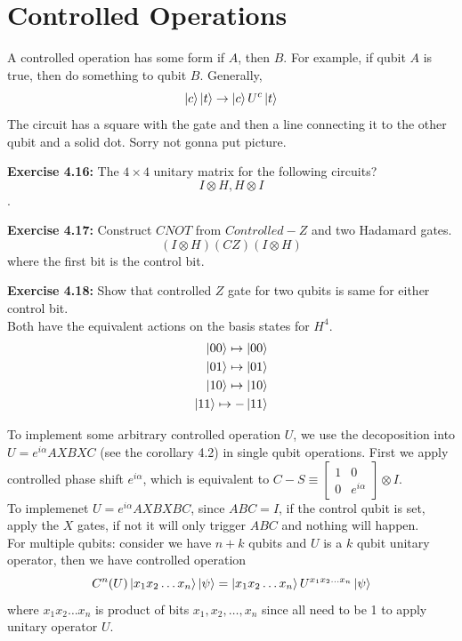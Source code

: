 \documentclass{article}
\begin{document}
\section{Controlled Operations}
A controlled operation has some form if $A$, then $B$. For example, if qubit $A$ is true, then do something to qubit $B$. Generally,
$$\ket{c}\ket{t} \to \ket{c} U^c \ket{t}$$ 
The circuit has a square with the gate and then a line connecting it to the other qubit and a solid dot. Sorry not gonna put picture.
\begin{tcolorbox}\textbf{Exercise 4.16:}
	The $4\times4$ unitary matrix for the following circuits?\\
	$$I\otimes H, H\otimes I$$.
\end{tcolorbox}
\begin{tcolorbox}\textbf{Exercise 4.17:}
	Construct $CNOT$ from $Controlled-Z$ and two Hadamard gates.\\
	$$(I \otimes H)(CZ)(I \otimes H)$$
	where the first bit is the control bit.
\end{tcolorbox}
\begin{tcolorbox}\textbf{Exercise 4.18:} Show that controlled $Z$ gate for two qubits is same for either control bit.\\
	Both have the equivalent actions on the basis states for $H^{4}$.
	\begin{align*}
		\ket{00} \mapsto \ket{00}\\
		\ket{01} \mapsto \ket{01}\\
		\ket{10} \mapsto \ket{10}\\
		\ket{11} \mapsto -\ket{11}
	\end{align*}
\end{tcolorbox}
To implement some arbitrary controlled operation $U$, we use the decoposition into $U = e^{i\alpha }AXBXC$ (see the corollary 4.2) in single qubit operations. First we apply controlled phase shift $e^{i\alpha}$, which is equivalent to $C-S \equiv \begin{bmatrix}1 & 0 \\ 0 & e^{i\alpha }\end{bmatrix} \otimes I$.\\
To implemenet $U=e^{i\alpha}AXBXBC$, since $ABC = I$, if the control qubit is set, apply the $X$ gates, if not it will only trigger $ABC$ and nothing will happen.\\
For multiple qubits: consider we have $n+k$ qubits and $U$ is a $k$ qubit unitary operator, then we have controlled operation $$C^n(U)\ket{x_1x_2\dots x_n} \ket{\psi} = \ket{x_1x_2\dots x_n}U^{x_1 x_2\dots x_n}\ket{\psi}$$ where $x_1x_2\dots x_n$ is product of bits $x_1, x_2, \dots, x_n$ since all need to be 1 to apply unitary operator $U$. \\
\end{document}
